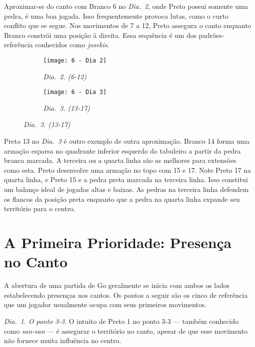 Aproximar-se do canto com Branco 6 no \emph{Dia.\@~2}, onde Preto possui somente uma pedra, é uma boa jogada. Isso frequentemente provoca lutas, como o curto conflito que se segue. Nos movimentos de 7 a 12, Preto assegura  o canto enquanto Branco constrói uma posição à direita. Essa sequência é um dos padrões-referência conhecidos como \emph{josekis}.

\begin{figure}[h!]
    \centering
    \begin{subfigure}[t]{.495\textwidth}
        \centering
        \texttt{[image: 6 - Dia 2]}
        \captionsetup{justification=centering}
        \caption*{\emph{Dia.\@~2. (6-12)}}
    \end{subfigure}
    \hfill
    \begin{subfigure}[t]{.495\textwidth}
        \centering
        \texttt{[image: 6 - Dia 3]}
        \captionsetup{justification=centering}
        \caption*{\emph{Dia.\@~3. (13-17)}}
    \end{subfigure}
\end{figure}

Preto 13 no \emph{Dia.\@~3} é outro exemplo de outra aproximação. Branco 14 forma uma armação esparsa no quadrante inferior esquerdo do tabuleiro a partir da pedra branca marcada. A terceira ou a quarta linha são as melhores para extensões como esta. Preto desenvolve uma armação no topo com 15 e 17. Note Preto 17 na quarta linha, e Preto 15 e a pedra preta marcada na terceira linha. Isso constitui um balanço ideal de jogadas altas e baixas. As pedras na terceira linha defendem os flancos da posição preta enquanto que a pedra na quarta linha expande seu território para o centro.

\pagebreak

\section{A Primeira Prioridade: Presença no Canto}

A abertura de uma partida de Go geralmente se inicia com ambos os lados estabelecendo presenças nos cantos. Os pontos a seguir são os cinco de referência que um jogador usualmente ocupa com seus primeiros movimentos.

\emph{Dia.\@~1. O ponto 3-3.} O intuito de Preto 1 no ponto 3-3 --- também conhecido como \emph{san-san} --- é assegurar o território no canto, apesar de que esse movimento não fornece muita influência no centro.

